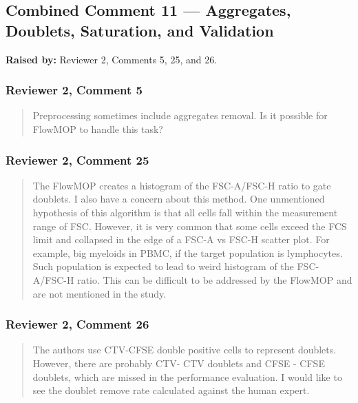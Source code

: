 \documentclass[
  11pt,
  a4paper,
]{article}
\begin{document}
\subsection{Combined Comment 11 --- Aggregates, Doublets, Saturation,
and
Validation}\label{combined-comment-11--aggregates-doublets-saturation-and-validation}

\textbf{Raised by:} Reviewer 2, Comments 5, 25, and 26.

\subsubsection{Reviewer 2, Comment 5}\label{reviewer-2-comment-5}

\begin{quote}
Preprocessing sometimes include aggregates removal. Is it possible for
FlowMOP to handle this task?
\end{quote}

\subsubsection{Reviewer 2, Comment 25}\label{reviewer-2-comment-25}

\begin{quote}
The FlowMOP creates a histogram of the FSC-A/FSC-H ratio to gate
doublets. I also have a concern about this method. One unmentioned
hypothesis of this algorithm is that all cells fall within the
measurement range of FSC. However, it is very common that some cells
exceed the FCS limit and collapsed in the edge of a FSC-A vs FSC-H
scatter plot. For example, big myeloids in PBMC, if the target
population is lymphocytes. Such population is expected to lead to weird
histogram of the FSC-A/FSC-H ratio. This can be difficult to be
addressed by the FlowMOP and are not mentioned in the study.
\end{quote}

\subsubsection{Reviewer 2, Comment 26}\label{reviewer-2-comment-26}

\begin{quote}
The authors use CTV-CFSE double positive cells to represent doublets.
However, there are probably CTV- CTV doublets and CFSE - CFSE doublets,
which are missed in the performance evaluation. I would like to see the
doublet remove rate calculated against the human expert.
\end{quote}
\end{document}
